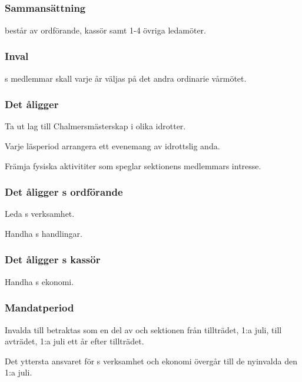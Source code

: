 \subsection{\FRITIDFULL}
\subsubsection{Sammansättning}
\FRITID{} består av ordförande, kassör samt 1-4 övriga ledamöter.

\subsubsection{Inval}
\FRITID{}s medlemmar skall varje år väljas på det andra ordinarie vårmötet.

\subsubsection{Det åligger \FRITID}
\begin{att}
	\item Ta ut lag till Chalmersmästerskap i olika idrotter.
	\item Varje läsperiod arrangera ett evenemang av idrottslig anda.
	\item Främja fysiska aktivititer som speglar sektionens medlemmars intresse.
\end{att}

\subsubsection{Det åligger \FRITID{}s ordförande}
\begin{att}
	\item Leda \FRITID{}s verksamhet.
	\item Handha \FRITID{}s handlingar.
\end{att}

\subsubsection{Det åligger \FRITID{}s kassör}
\begin{att}
	\item Handha \FRITID{}s ekonomi.
\end{att}

\subsubsection{Mandatperiod}
Invalda till \FRITID{} betraktas som en del av \FRITID{} och sektionen från tillträdet, 1:a juli, till avträdet, 1:a juli ett år efter tillträdet.

Det yttersta ansvaret för \FRITID{}s verksamhet och ekonomi övergår till de nyinvalda den 1:a juli.